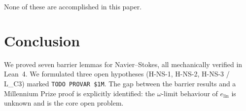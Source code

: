 \documentclass[12pt]{article}
\theoremstyle{plain}
\theoremstyle{definition}
\begin{document}
None of these are accomplished in this paper.

\section{Conclusion}

We proved seven barrier lemmas for Navier--Stokes, all mechanically
verified in Lean~4.  We formulated three open hypotheses
(H-NS-1, H-NS-2, H-NS-3 / L\_C3) marked \texttt{TODO PROVAR \$1M}.
The gap between the barrier results and a Millennium Prize proof
is explicitly identified: the $\omega$-limit behaviour of
$e_{\mathrm{lin}}$ is unknown and is the core open problem.


\end{document}
